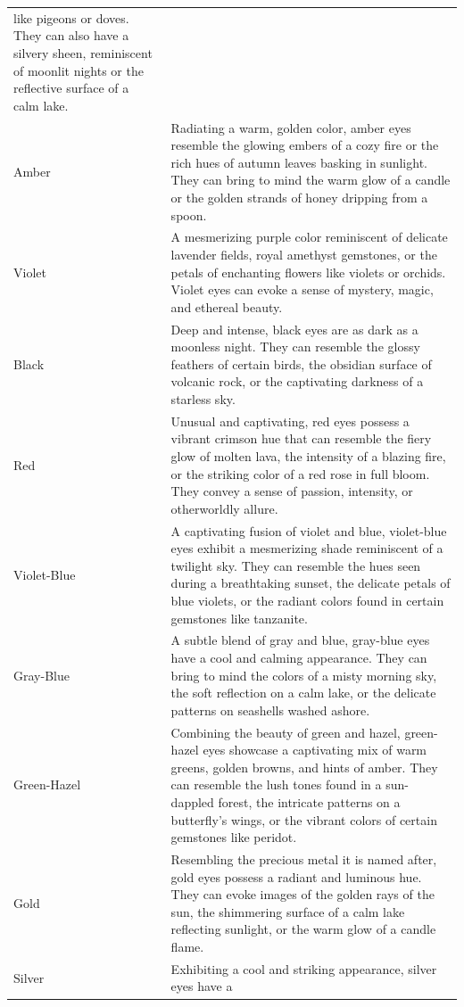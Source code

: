 \begin{longtable}[]{@{}
  >{\raggedright\arraybackslash}p{}
  >{\raggedright\arraybackslash}p{}@{}}
like pigeons or doves. They can also have a silvery sheen, reminiscent
of moonlit nights or the reflective surface of a calm lake. \\
Amber & Radiating a warm, golden color, amber eyes resemble the glowing
embers of a cozy fire or the rich hues of autumn leaves basking in
sunlight. They can bring to mind the warm glow of a candle or the golden
strands of honey dripping from a spoon. \\
Violet & A mesmerizing purple color reminiscent of delicate lavender
fields, royal amethyst gemstones, or the petals of enchanting flowers
like violets or orchids. Violet eyes can evoke a sense of mystery,
magic, and ethereal beauty. \\
Black & Deep and intense, black eyes are as dark as a moonless night.
They can resemble the glossy feathers of certain birds, the obsidian
surface of volcanic rock, or the captivating darkness of a starless
sky. \\
Red & Unusual and captivating, red eyes possess a vibrant crimson hue
that can resemble the fiery glow of molten lava, the intensity of a
blazing fire, or the striking color of a red rose in full bloom. They
convey a sense of passion, intensity, or otherworldly allure. \\
Violet-Blue & A captivating fusion of violet and blue, violet-blue eyes
exhibit a mesmerizing shade reminiscent of a twilight sky. They can
resemble the hues seen during a breathtaking sunset, the delicate petals
of blue violets, or the radiant colors found in certain gemstones like
tanzanite. \\
Gray-Blue & A subtle blend of gray and blue, gray-blue eyes have a cool
and calming appearance. They can bring to mind the colors of a misty
morning sky, the soft reflection on a calm lake, or the delicate
patterns on seashells washed ashore. \\
Green-Hazel & Combining the beauty of green and hazel, green-hazel eyes
showcase a captivating mix of warm greens, golden browns, and hints of
amber. They can resemble the lush tones found in a sun-dappled forest,
the intricate patterns on a butterfly's wings, or the vibrant colors of
certain gemstones like peridot. \\
Gold & Resembling the precious metal it is named after, gold eyes
possess a radiant and luminous hue. They can evoke images of the golden
rays of the sun, the shimmering surface of a calm lake reflecting
sunlight, or the warm glow of a candle flame. \\
Silver & Exhibiting a cool and striking appearance, silver eyes have a

\end{longtable}
